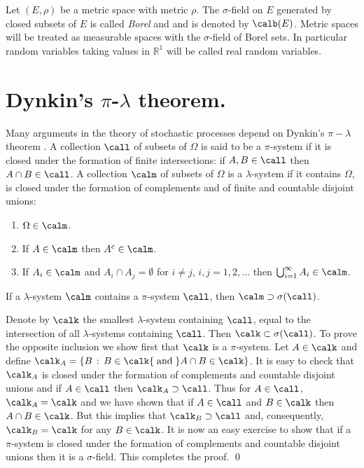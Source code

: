 \documentclass[preprint]{imsart}
\def\R{\mathbb R}
\begin{document}
{Let $(E,\rho)$ be a metric space with metric $\rho$.
The $\sigma$-field on $E$ generated by closed subsets
of $E$ is called {\em Borel} and and is denoted by
$\calb (E)$. Metric spaces will be treated as
measurable spaces with the $\sigma$-field of Borel
sets. In particular random variables taking values in
$\R^1$ will be called real random variables.


\section{Dynkin's $\pi$-$\lambda$ theorem.}



Many arguments in the theory of stochastic processes
depend on Dynkin's $\pi -\lambda$ theorem \cite{Dy}. A collection
$\call$ of subsets of $\Omega$ is said to be a
$\pi$-system if it is closed under the formation of
finite intersections: if $A,B\in\call$ then $A\cap
B\in\call$. A collection $\calm$ of subsets of $\Omega$
is a $\lambda$-system if it contains $\Omega$, is
closed under the formation of complements and of finite
and countable disjoint unions:
\begin{enumerate}
  \item[1)] $\Omega\in\calm$.

  \item[2)] If $A\in\calm$ then $A^c\in\calm$.

  \item[3)] If $A_i\in\calm$ and $A_i\cap A_j=\emptyset$
  for $i\ne j$, $i,j=1,2,\ldots$ then
  $\bigcup_{i=1}^{\infty}A_i \in \calm$.
\end{enumerate}

\begin{Theorem}
  If a $\lambda$-system $\calm$ contains a $\pi$-system
  $\call$, then $\calm\supset\sigma(\call)$.
\end{Theorem}

Denote by $\calk$ the smallest $\lambda$-system
containing $\call$, equal to the intersection of all
$\lambda$-systems containing $\call$. Then
$\calk\subset\sigma(\call)$. To prove the opposite
inclusion we show first that $\calk$ is a $\pi$-system.
Let $A\in\calk$ and define $\calk_A=\{B\, :\, B\in\calk
{\rm \; and\;} A\cap B\in\calk\}$. It is easy to check
that $\calk_A$ is closed under the formation of
complements and countable disjoint unions and if
$A\in\call$ then $\calk_A\supset \call$. Thus for
$A\in\call$, $\calk_A=\calk$ and we have shown that if
$A\in\call$ and $B\in\calk$ then $A\cap B\in\calk$. But
this implies that $\calk_B\supset \call$ and,
consequently, $\calk_B=\calk$ for any $B\in\calk$. It
is now an easy exercise to show that if a $\pi$-system
is closed under the formation of complements and
countable disjoint unions then it is a $\sigma$-field.
This completes the proof. \qed


}
\end{document}
